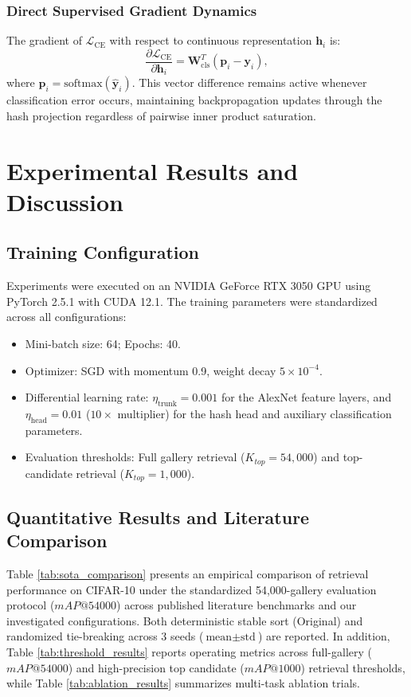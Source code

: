 \documentclass[10pt,conference]{IEEEtran}
\begin{document}
\subsubsection{Direct Supervised Gradient Dynamics}
The gradient of $\mathcal{L}_{\text{CE}}$ with respect to continuous representation $\mathbf{h}_i$ is:
\begin{equation}
    \frac{\partial \mathcal{L}_{\text{CE}}}{\partial \mathbf{h}_i} = \mathbf{W}_{\text{cls}}^T (\mathbf{p}_i - \mathbf{y}_i),
\end{equation}
where $\mathbf{p}_i = \mathrm{softmax}(\hat{\mathbf{y}}_i)$. This vector difference remains active whenever classification error occurs, maintaining backpropagation updates through the hash projection regardless of pairwise inner product saturation.

\section{Experimental Results and Discussion}

\subsection{Training Configuration}
Experiments were executed on an NVIDIA GeForce RTX 3050 GPU using PyTorch 2.5.1 with CUDA 12.1. The training parameters were standardized across all configurations:
\begin{itemize}
    \item Mini-batch size: 64; Epochs: 40.
    \item Optimizer: SGD with momentum 0.9, weight decay $5 \times 10^{-4}$.
    \item Differential learning rate: $\eta_{\text{trunk}} = 0.001$ for the AlexNet feature layers, and $\eta_{\text{head}} = 0.01$ ($10\times$ multiplier) for the hash head and auxiliary classification parameters.
    \item Evaluation thresholds: Full gallery retrieval ($K_{top} = 54,000$) and top-candidate retrieval ($K_{top} = 1,000$).
\end{itemize}

\subsection{Quantitative Results and Literature Comparison}
Table \ref{tab:sota_comparison} presents an empirical comparison of retrieval performance on CIFAR-10 under the standardized 54,000-gallery evaluation protocol ($mAP@54000$) across published literature benchmarks and our investigated configurations. Both deterministic stable sort (Original) and randomized tie-breaking across 3 seeds ($\text{mean} \pm \text{std}$) are reported. In addition, Table \ref{tab:threshold_results} reports operating metrics across full-gallery ($mAP@54000$) and high-precision top candidate ($mAP@1000$) retrieval thresholds, while Table \ref{tab:ablation_results} summarizes multi-task ablation trials.
\end{document}
